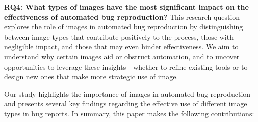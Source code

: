  
\noindent
\textbf{RQ4: What types of images have the most significant impact on the effectiveness of automated bug reproduction?} 
This research question explores the role of images in automated bug reproduction by distinguishing between image types that contribute positively to the process, those with negligible impact, and those that may even hinder effectiveness. We aim to understand why certain images aid or obstruct automation, and to uncover opportunities to leverage these insights—whether to refine existing tools or to design new ones that make more strategic use of image.



Our study highlights the importance of images in automated bug reproduction and presents several key findings regarding the effective use of different image types in bug reports.
In summary, this paper makes the following contributions:
%

